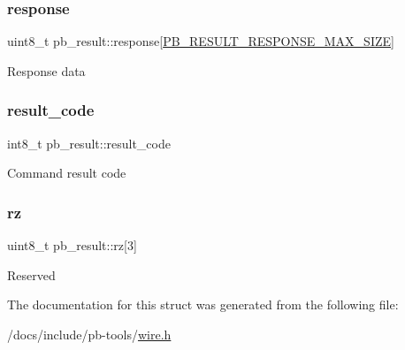 \subsubsection{\texorpdfstring{response}{response}}
{\footnotesize\ttfamily uint8\+\_\+t pb\+\_\+result\+::response\mbox{[}\hyperlink{wire_8h_a2e780e3a8957b04e0dd4bc78cd595551}{P\+B\+\_\+\+R\+E\+S\+U\+L\+T\+\_\+\+R\+E\+S\+P\+O\+N\+S\+E\+\_\+\+M\+A\+X\+\_\+\+S\+I\+ZE}\mbox{]}}

Response data \mbox{\label{structpb__result_aae39409d9cd1da2a390d2666e1f35450}} 
\subsubsection{\texorpdfstring{result\+\_\+code}{result\_code}}
{\footnotesize\ttfamily int8\+\_\+t pb\+\_\+result\+::result\+\_\+code}

Command result code \mbox{\label{structpb__result_a7ae704b210b447ff4c3f647158d3e4a4}} 
\subsubsection{\texorpdfstring{rz}{rz}}
{\footnotesize\ttfamily uint8\+\_\+t pb\+\_\+result\+::rz\mbox{[}3\mbox{]}}

Reserved 

The documentation for this struct was generated from the following file\+:\begin{DoxyCompactItemize}
\item 
/docs/include/pb-\/tools/\hyperlink{wire_8h}{wire.\+h}\end{DoxyCompactItemize}
